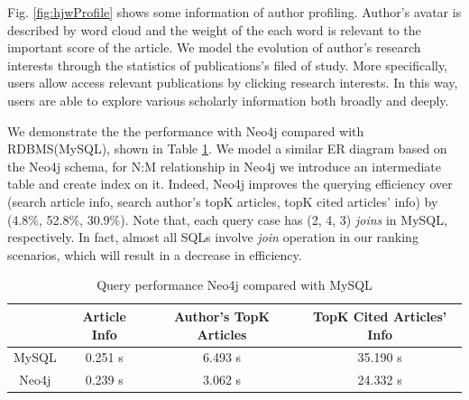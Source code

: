 \par
Fig. \ref{fig:hjwProfile} shows some information of author profiling. Author's avatar is described by word cloud and the weight of the each word is relevant to the important score of the article. We model the evolution of author's research interests through the statistics of publications's filed of study. More specifically, users allow access relevant publications by clicking research interests. In this way, users are able to explore various scholarly information both broadly and deeply.



We demonstrate the the performance with Neo4j compared with RDBMS(MySQL), shown in Table \ref{tab-compare}. We model a similar ER diagram based on the Neo4j schema, for N:M relationship in Neo4j we introduce an intermediate table and create index on it. Indeed, Neo4j improves the querying efficiency over (search article info, search author's topK articles, topK cited articles' info) by (4.8\%, 52.8\%, 30.9\%). Note that, each query case has (2, 4, 3) {\em joins} in MySQL, respectively. In fact, almost all SQLs involve {\em join} operation in our ranking scenarios, which will result in a decrease in efficiency.



\begin{table}[t!]
\begin{center}
\caption{Query performance Neo4j compared with MySQL}
\label{tab-compare}
\begin{scriptsize}
\begin{tabular}{ c c c c}
\hline
{} & {Article Info} & {Author's TopK Articles} & {TopK Cited Articles' Info}\\
\hline
MySQL & 0.251 s  & 6.493 s & 35.190 s \\
Neo4j & 0.239 s  & 3.062 s & 24.332 s \\
\hline
\end{tabular} \\ %
\end{scriptsize}
\end{center}
\end{table}

